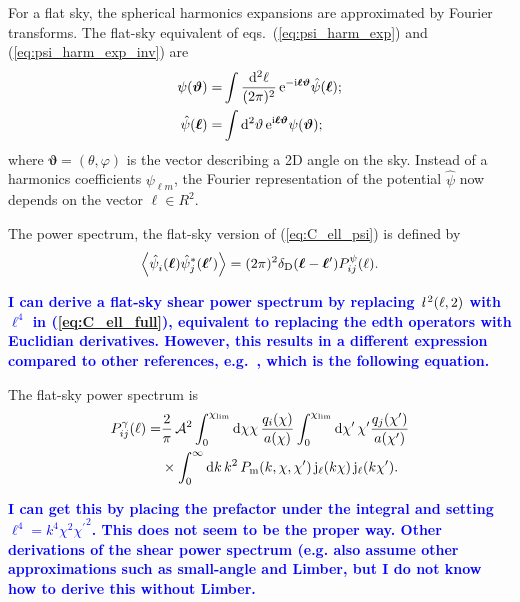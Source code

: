 \documentclass[useAMS,usenatbib]{mn2e} %
\newcommand{\ellbar}{\hbox{\it \l}\,}
\newcommand{\pref}{{\cal A}}
\renewcommand{\vec}{\bm}
\newcommand{\mk}[1]{{\bf\textcolor{blue}{#1}}}
\begin{document}
For a flat sky, the spherical harmonics expansions are approximated by Fourier
transforms. The flat-sky equivalent of eqs.~(\ref{eq:psi_harm_exp}) and
(\ref{eq:psi_harm_exp_inv}) are
%
\begin{align}
  \psi(\vec \vartheta) = & \int \frac{{\rm d}^2 \ell}{(2\pi)^2} \, {\rm e}^{-{\rm i} \vec \ell \vec \vartheta} \hat \psi(\vec \ell);
  \label{eq:psi_fourier}
  \\
  \hat \psi(\vec \ell) = & \int {\rm d}^2 \vartheta \, {\rm e}^{{\rm i} \vec \ell \vec \vartheta} \psi(\vec \vartheta);
  \label{eq:psi_fourier_inv}
\end{align}
%
where $\vec \vartheta = (\theta, \varphi)$ is the vector describing a 2D angle on the sky.
Instead of a harmonics coefficients $\psi_{\ell m}$, the Fourier representation of the potential
$\hat \psi$ now depends on the vector $\vec \ell \in R^2$.

The power spectrum, the flat-sky version of
(\ref{eq:C_ell_psi}) is defined by
%
\begin{equation}
  \left\langle \hat \psi_i^{}(\vec \ell) \hat \psi_j^\ast(\vec \ell^\prime) \right\rangle
    = (2\pi)^2 \delta_{\rm D}(\vec \ell - \vec \ell^\prime) P^\psi_{ij}(\ell).
  \label{eq:P_ell_psi}
\end{equation}


\mk{I can derive a flat-sky shear power spectrum by replacing $\ellbar^2(\ell, 2)$ with $\ell^4$
in (\ref{eq:C_ell_full}), equivalent to replacing the edth operators with Euclidian derivatives.
However, this results in a different expression compared to other references, e.g.~\cite{2008PhRvD..78d3002S},
which is the following equation.}

The flat-sky power spectrum is
%
\begin{align}
  P_{ij}^\gamma(\ell) = & \frac 2 \pi \, \pref^2
                 \int_{0}^{\chi_{\rm lim}} {\rm d} \chi \chi \, \frac{q_i(\chi)}{a(\chi)}
                \int_{0}^{\chi_{\rm lim}} {\rm d} \chi^\prime\, \chi^\prime
                \frac{q_j(\chi^\prime)}{a(\chi^\prime)}
                \nonumber \\
                & \times \int_0^\infty {\rm d} k \, k^2 \, P_{\rm m}(k, \chi, \chi^\prime) \,
                {\rm j}_\ell(k \chi) \, {\rm j}_\ell(k \chi^\prime) .
  \label{eq:P_ell_gamma}
\end{align}
%

\mk{I can get this by placing the prefactor under the integral and
setting $\ell^4 = k^4 \chi^2 {\chi^\prime}^2$. This does not seem to be the proper way.
Other derivations of the shear power spectrum (e.g.\cite{BS01} also assume other approximations
such as small-angle and Limber, but I do not know how to derive this without Limber.}
\end{document}

